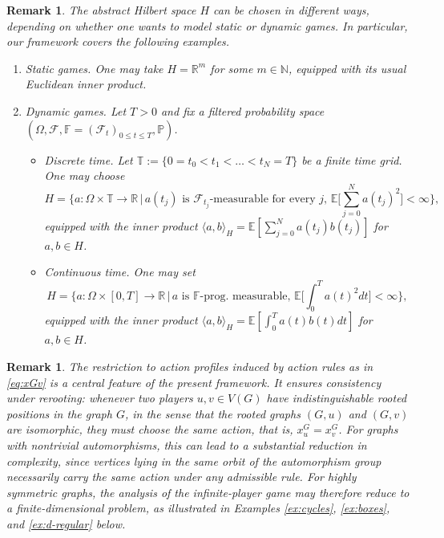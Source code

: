 \documentclass[11pt]{article}
\newtheorem{remark}[theorem]{Remark}
\numberwithin{equation}{section}
\begin{document}
\begin{remark}\label{rem:examples-H}
The abstract Hilbert space \(H\) can be chosen in different ways, depending on whether one wants to model static or dynamic games. In particular, our framework covers the following examples.
\begin{enumerate}[label=(\roman*)]
\item \emph{Static games.}  
One may take \(H=\mathbb R^m\) for some \(m\in\mathbb N\), equipped with its usual Euclidean inner product.
\item \emph{Dynamic games.}  
Let \(T>0\) and fix a filtered probability space \((\Omega,\mathcal F,\mathbb F=(\mathcal F_t)_{0\le t\le T},\mathbb P)\). 
\begin{itemize}
\item \emph{Discrete time.}  
Let \(\mathbb T:=\{0=t_0<t_1<\ldots<t_N=T\}\) be a finite time grid. One may choose
\[
H=\bigg\{ a:\Omega\times\mathbb T\to\mathbb R\,\bigg|\,
a(t_j)\text{ is }\mathcal F_{t_j}\text{-measurable for every $j$, } 
\mathbb E\bigg[\sum_{j=0}^N  a(t_j)^2\bigg]<\infty\bigg\},
\]
equipped with the inner product
$\langle  a, b\rangle_H=\mathbb E[\sum_{j=0}^N  a(t_j) b(t_j)]$ for $a,b\in H$.
\item \emph{Continuous time.}  One may set 
\[
H=\bigg\{ a:\Omega\times[0,T]\to\mathbb R\,\bigg|\,
a \text{ is }\mathbb F\text{-prog.~measurable, }
\mathbb E\bigg[\int_0^T a(t)^2dt\bigg]<\infty\bigg\},
\]
equipped with the inner product
$\langle a,b\rangle_H=\mathbb E[\int_0^T  a(t) b(t)dt]$ for $a,b\in H$.
\end{itemize}
\end{enumerate}
\end{remark}
\begin{remark}
The restriction to action profiles induced by action rules as in \eqref{eq:xGv} is a central feature of the present framework. It ensures consistency under rerooting: whenever two players \(u,v\in V(G)\) have indistinguishable rooted positions in the graph
$G$, in the sense that the rooted graphs $(G,u)$ and $(G,v)$ are isomorphic, they must choose the same action, that is, \(x_u^G=x_v^G\). For graphs with nontrivial automorphisms, this can lead to a substantial reduction in complexity, since vertices lying in the same orbit of the automorphism group necessarily carry the same action under any admissible rule. For highly symmetric graphs, the analysis of the infinite-player game may therefore reduce to a finite-dimensional problem, as illustrated in Examples \ref{ex:cycles}, \ref{ex:boxes}, and \ref{ex:d-regular} below.
\end{remark}
\end{document}
